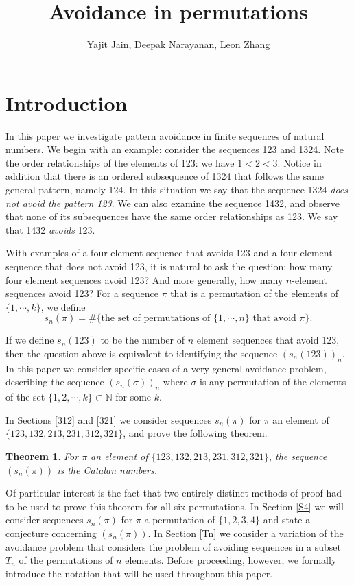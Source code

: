 \documentclass[11pt,letterpaper,twoside,english]{article}
\title{Avoidance in permutations}
\author{Yajit Jain, Deepak Narayanan, Leon Zhang}
\theoremstyle{theorem}
\newtheorem*{theorem*}{Theorem}
\theoremstyle{remark}
\begin{document}
\maketitle

\section{Introduction}
In this paper we investigate pattern avoidance in finite sequences of natural numbers. We begin with an example: consider the sequences 123 and 1324. Note the order relationships of the elements of 123: we have $1< 2 < 3$. Notice in addition that there is an ordered subsequence of 1324 that follows the same general pattern, namely 124. In this situation we say that the sequence 1324 \emph{does not avoid the pattern 123}. We can also examine the sequence 1432, and observe that none of its subsequences have the same order relationships as 123. We say that 1432 \emph{avoids} 123.

With examples of a four element sequence that avoids 123 and a four element sequence that does not avoid 123, it is natural to ask the question: how many four element sequences avoid 123? And more generally, how many $n$-element sequences avoid 123? For a sequence $\pi$ that is a permutation of the elements of $\{1,\cdots,k\}$, we define
$$
s_n(\pi)=\#\{\text{the set of permutations of $\{1,\cdots, n\}$ that avoid $\pi$}\}.
$$


If we define $s_n(123)$ to be the number of $n$ element sequences that avoid 123, then the question above is equivalent to identifying the sequence $(s_n(123))_n$. In this paper we consider specific cases of a very general avoidance problem, describing the sequence $(s_n(\sigma))_n$ where $\sigma$ is any permutation of the elements of the set $\{1,2,\cdots, k\}\subset\mathbb{N}$ for some $k$.

In Sections \ref{312} and \ref{321} we consider sequences $s_n(\pi)$ for $\pi$ an element of  \\ $\{123,132,213,231,312,321\}$, and prove the following theorem.

\begin{theorem*}
For $\pi$ an element of $\{123,132,213,231,312,321\}$, the sequence $(s_n(\pi))$ is the Catalan numbers.
\end{theorem*}

Of particular interest is the fact that two entirely distinct methods of proof had to be used to prove this theorem for all six permutations. In Section \ref{S4} we will consider sequences $s_n(\pi)$ for $\pi$ a permutation of $\{1,2,3,4\}$ and state a conjecture concerning $(s_n(\pi))$. In Section \ref{Tn} we consider a variation of the avoidance problem that considers the problem of avoiding sequences in a subset $T_n$ of the permutations of $n$ elements. Before proceeding, however, we formally introduce the notation that will be used throughout this paper.  
\end{document}

